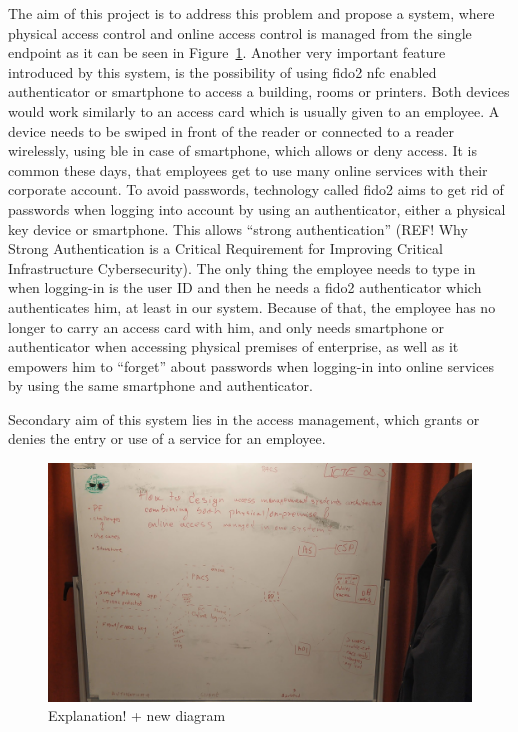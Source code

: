 The aim of this project is to address this problem and propose a system, where physical access control and online access control is managed from the single endpoint as it can be seen in Figure~\ref{fig:IntroArchitecture}. Another very important feature introduced by this system, is the possibility of using \acrshort{fido}2 \acrshort{nfc} enabled authenticator or smartphone to access a building, rooms or printers. Both devices would work similarly to an access card which is usually given to an employee. A device needs to be swiped in front of the reader or connected to a reader wirelessly, using \acrshort{ble} in case of smartphone, which allows or deny access. It is common these days, that employees get to use many online services with their corporate account. To avoid passwords, technology called \acrshort{fido}2 aims to get rid of passwords when logging into account by using an authenticator, either a physical key device or smartphone. This allows “strong authentication” (REF! Why Strong Authentication is a Critical Requirement for Improving Critical Infrastructure Cybersecurity). The only thing the employee needs to type in when logging-in is the user ID and then he needs a \acrshort{fido}2 authenticator which authenticates him, at least in our system. Because of that, the employee has no longer to carry an access card with him, and only needs smartphone or authenticator when accessing physical premises of enterprise, as well as it empowers him to “forget” about passwords when logging-in into online services by using the same smartphone and authenticator.

Secondary aim of this system lies in the access management, which grants or denies the entry or use of a service for an employee. 

\begin{figure}[ht]
    \centering
    \includegraphics[width=.95\textwidth]{00images/IntroArchitecture}
    \caption{Explanation! + new diagram}
    \label{fig:IntroArchitecture}
\end{figure}



